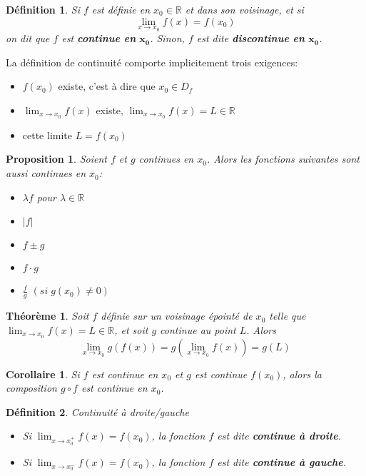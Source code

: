 \documentclass[10pt,a4paper]{book}
\newcommand{\R}{\mathbb{R}}
\newtheorem{theorem}{Théorème}[section]
\newtheorem{definition}{Définition}[section]
\newtheorem{proposition}{Proposition}[section]
\newtheorem{corollaire}{Corollaire}[theorem]
\begin{document}
\begin{definition}
Si $f$ est définie en $x_0 \in \R$ et dans son voisinage, et si
\begin{equation*}
\lim_{x \rightarrow x_0} f(x) = f(x_0)
\end{equation*}
on dit que $f$ est \textbf{continue en} $\mathbf{x_0}$. Sinon, $f$ est dite \textbf{discontinue en} $\mathbf{x_0}$.
\end{definition}
La définition de continuité comporte implicitement trois exigences:
\begin{itemize}
\item $f(x_0)$ existe, c'est à dire que $x_0 \in D_f$
\item $\lim_{x \rightarrow x_0} f(x)$ existe, $\lim_{x \rightarrow x_0} f(x) = L \in \R$
\item cette limite $L = f(x_0)$
\end{itemize}

\begin{proposition}
Soient $f$ et $g$ continues en $x_0$. Alors les fonctions suivantes sont aussi continues en $x_0$:
\begin{itemize}
\item $\lambda f$ pour $\lambda \in \R$
\item $\left| f \right|$
\item $f \pm g$
\item $f \cdot g$
\item $\frac{f}{g}$ $(si \; g(x_0) \neq 0)$
\end{itemize}
\end{proposition}

\begin{theorem}
Soit $f$ définie sur un voisinage épointé de $x_0$ telle que $\lim_{x \rightarrow x_0} f(x) = L \in \R$, et soit $g$ continue au point $L$. Alors
\begin{equation*}
\lim_{x \rightarrow x_0} g(f(x)) = g(\lim_{x \rightarrow x_0} f(x)) = g(L)
\end{equation*}
\end{theorem}

\begin{corollaire}
Si $f$ est continue en $x_0$ et $g$ est continue $f(x_0)$, alors la composition $g \circ f$ est continue en $x_0$.
\end{corollaire}

\begin{definition} Continuité à droite/gauche
\begin{itemize}
\item Si $\lim_{x \rightarrow x_0^+} f(x) = f(x_0)$, la fonction $f$ est dite \textbf{continue à droite}.
\item Si $\lim_{x \rightarrow x_0^-} f(x) = f(x_0)$, la fonction $f$ est dite \textbf{continue à gauche}.
\end{itemize}
\end{definition}
\end{document}
